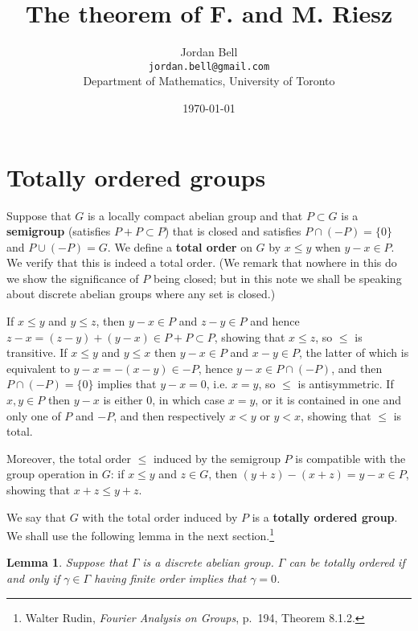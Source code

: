 \documentclass{article}
\newtheorem{lemma}[theorem]{Lemma}
\begin{document}
\title{The theorem of F. and M. Riesz}
\author{Jordan Bell\\ \texttt{jordan.bell@gmail.com}\\Department of Mathematics, University of Toronto}
\date{\today}
\maketitle


\section{Totally ordered groups}
Suppose that $G$ is a locally compact abelian group and that  $P \subset G$ is a \textbf{semigroup} (satisfies $P+P \subset P$) that is closed
and satisfies $P \cap (-P) = \{0\}$ and $P \cup (-P) = G$.
We define a \textbf{total order} on $G$ by $x \leq y$ when $y - x \in P$. We verify that this is indeed a total order. (We remark
that nowhere in this do we show the significance of $P$ being closed; but in this note we shall be speaking about discrete abelian groups
where any set is closed.)

If $x \leq y$ and $y \leq z$, then $y-x \in P$ and $z-y \in P$ and hence $z-x=(z-y)+(y-x) \in P+P \subset P$, showing that
$x \leq z$, so $\leq$ is transitive. If $x \leq y$ and $y \leq x$ then $y-x \in P$ and $x-y \in P$, the latter of which
is equivalent to $y-x=-(x-y) \in -P$, hence $y-x \in P \cap (-P)$, and  then $P \cap (-P) = \{0\}$ implies that $y-x=0$, i.e. $x=y$, so
$\leq$ is antisymmetric. If $x,y \in P$ then $y-x$ is either $0$, in which case $x=y$, or it is contained in one and only
one of $P$ and $-P$, and then respectively $x<y$ or $y<x$, showing that $\leq$ is total. 

Moreover, the total order $\leq$ induced by the semigroup $P$ is compatible with the group operation in $G$:
if $x \leq y$ and $z \in G$, then $(y+z)-(x+z)=y-x \in P$, showing that $x+z \leq y+z$. 

We say that $G$ with the total order induced by $P$ is a \textbf{totally ordered group}. We shall use the following lemma in the next section.\footnote{Walter Rudin, {\em Fourier Analysis on Groups}, p.~194, Theorem 8.1.2.}

\begin{lemma}
Suppose that $\Gamma$ is a discrete abelian group.  $\Gamma$ can be totally ordered if and only if $\gamma \in \Gamma$
having finite order implies that $\gamma=0$.
\label{812}
\end{lemma}
\end{document}
